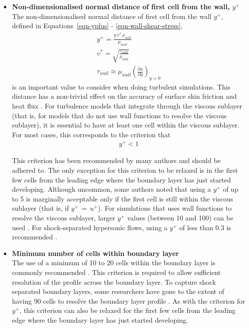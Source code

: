 \begin{itemize}

\item \textbf{Non-dimensionalised normal distance of first cell from the wall, $y^+$} \\
The non-dimensionalised normal distance of first cell from the wall $y^+$,
defined in Equations~\ref{eqn-yplus} - \ref{eqn-wall-shear-stress}, 
%
\begin{eqnarray}
y^+ = \frac{y \, \upsilon^{\ast} \, \rho_{wall}}{\mu_{wall}}
\label{eqn-yplus} \\
\upsilon^{\ast} = \sqrt{\frac{\tau_{wall}}{\rho_{wall}}}
\label{eqn-friction-velocity} \\
\tau_{wall} \approx \mu_{wall} \left( \frac{\partial u}{\partial y} \right) _{y=0}
\label{eqn-wall-shear-stress}
\end{eqnarray}
%
is an important value to consider when doing turbulent simulations. This 
distance has a non-trivial effect on the accuracy of surface skin friction 
and heat flux \cite{Wilcox2006}. For turbulence models that integrate through 
the viscous sublayer (that is, for models that do not use wall functions
to resolve the viscous sublayer), it is essential to have at least one cell 
within the viscous sublayer. For most cases, this corresponds to the criterion that
%
\begin{eqnarray}
y^+ < 1
\end{eqnarray}

This criterion has been recommended by many authors \cite{Wilcox2006,Versteeg2007,
Tu2008,ESI2004,AeroSoft2009,Fluent2006,Roy2003} and should be adhered to. 
The only exception for this criterion to be relaxed is in
the first few cells from the leading edge where the boundary layer has
just started developing. Although uncommon, some authors \cite{Tu2008,Fluent2006} 
noted that using a $y^+$ of up to 5 is marginally acceptable only if the first 
cell is still within the viscous sublayer (that is, if $y^+\,=\,u^+$). For 
simulations that uses wall functions to resolve the viscous sublayer, larger 
$y^+$ values (between 10 and 100) can be used \cite{Wilcox2006}. For 
shock-separated hypersonic flows, using a $y^+$ of less than 0.3 is 
recommended \cite{Wilcox2006}.

\item \textbf{Minimum number of cells within boundary layer} \\
The use of a minimum of 10 to 20 cells within the boundary layer is commonly recommended
\cite{Hirsch2007,Versteeg2007,Fluent2006}. This criterion is required to allow sufficient
resolution of the profile across the boundary layer. To capture shock separated boundary
layers, some researchers have gone to the extent of having 90 cells to resolve the boundary
layer profile \cite{Boyce2000}. As with the criterion for $y^+$, this criterion can also be
relaxed for the first few cells from the leading edge where the boundary layer has just
started developing.


\end{itemize}
